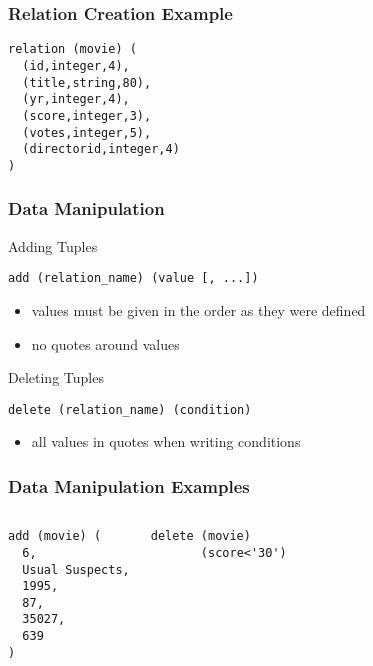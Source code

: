 \documentclass[dvipsnames]{beamer}
\theoremstyle{plain}
\begin{document}
\begin{frame}[fragile]
  \frametitle{Relation Creation Example}

  \begin{example}
    \begin{lstlisting}
relation (movie) (
  (id,integer,4),
  (title,string,80),
  (yr,integer,4),
  (score,integer,3),
  (votes,integer,5),
  (directorid,integer,4)
)
    \end{lstlisting}
  \end{example}
\end{frame}

\begin{frame}[fragile]
  \frametitle{Data Manipulation}

  \begin{block}{Adding Tuples}
    \begin{lstlisting}
add (relation_name) (value [, ...])
    \end{lstlisting}

    \begin{itemize}
      \item values must be given in the order as they were defined
      \item no quotes around values
    \end{itemize}
  \end{block}

  \pause
  \begin{block}{Deleting Tuples}
    \begin{lstlisting}
delete (relation_name) (condition)
    \end{lstlisting}

    \begin{itemize}
      \item all values in quotes when writing conditions
    \end{itemize}
  \end{block}
\end{frame}

\begin{frame}[fragile]
  \frametitle{Data Manipulation Examples}

  \begin{columns}[t]
    \begin{example}
      \begin{lstlisting}
add (movie) (
  6,
  Usual Suspects,
  1995,
  87,
  35027,
  639
)
      \end{lstlisting}
    \end{example}

    \pause
    \begin{example}
      \begin{lstlisting}
delete (movie)
       (score<'30')
      \end{lstlisting}
    \end{example}
  \end{columns}
\end{frame}
\end{document}
